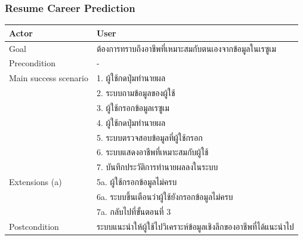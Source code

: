 \subsubsection{Resume Career Prediction}
\begin{table}[H]
    \begin{tabularx}{\textwidth}{|l|X|} 
        \hline
        Actor                 & User                                       \\ \hline
        Goal                  & ต้องการทราบถึงอาชีพที่เหมาะสมกับตนเองจากข้อมูลในเรซูเม            \\ \hline
        Precondition          & -                                               \\ \hline
        Main success scenario & 1. ผู้ใช้กดปุ่มทำนายผล                         \\
        & 2. ระบบถามข้อมูลของผู้ใช้                            \\
        & 3. ผู้ใช้กรอกข้อมูลเรซูเม                                  \\
        & 4. ผู้ใช้กดปุ่มทำนายผล                                \\
        & 5. ระบบตรวจสอบข้อมูลที่ผู้ใช้กรอก                           \\
        & 6. ระบบแสดงอาชีพที่เหมาะสมกับผู้ใช้                    \\
        & 7. บันทึกประวัติการทำนายผลลงในระบบ           \\ \hline
        Extensions (a)        & 5a. ผู้ใช้กรอกข้อมูลไม่ครบ                            \\
        & 6a. ระบบขึ้นเตือนว่าผู้ใช้ยังกรอกข้อมูลไม่ครบ              \\
        & 7a. กลับไปที่ขั้นตอนที่ 3                              \\ \hline
        Postcondition          & ระบบแนะนำให้ผู้ใช้ไปวิเคราะห์ข้อมูลเชิงลึกของอาชีพที่ได้แนะนำไป \\ \hline
    \end{tabularx}
\end{table}

